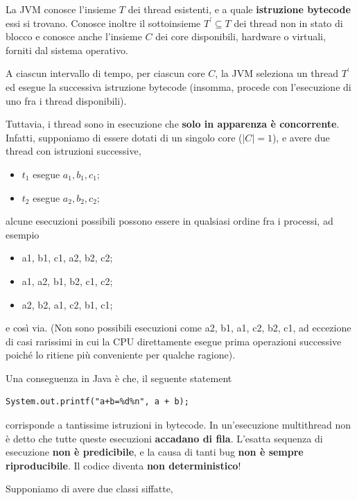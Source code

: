\documentclass[\fontsizeclass,twocolumn]{\classname}
\theoremstyle{definition}
\theoremstyle{definition}
\begin{document}
La JVM conosce l'insieme $T$ dei thread esistenti, e a quale \textbf{istruzione
bytecode} essi si trovano. Conosce inoltre il sottoinsieme $T^\prime \subseteq
T$ dei thread non in stato di blocco e conosce anche l'insieme $C$ dei core
disponibili, hardware o virtuali, forniti dal sistema operativo.

A ciascun intervallo di tempo, per ciascun core $C$, la JVM seleziona un thread
$T^\prime$ ed esegue la successiva istruzione bytecode (insomma, procede con
l'esecuzione di uno fra i thread disponibili).

Tuttavia, i thread sono in esecuzione che \textbf{solo in apparenza è
concorrente}. Infatti, supponiamo di essere dotati di un singolo core ($|C| =
1$), e avere due thread con istruzioni successive,
\begin{itemize}
    \item $t_1$ esegue $a_1, b_1, c_1$;
    \item $t_2$ esegue $a_2, b_2, c_2$;
\end{itemize}

alcune esecuzioni possibili possono essere in qualsiasi ordine fra i processi,
ad esempio

\begin{itemize}
    \item a1, b1, c1, a2, b2, c2;
    \item a1, a2, b1, b2, c1, c2;
    \item a2, b2, a1, c2, b1, c1;
\end{itemize}

e così via. (Non sono possibili esecuzioni come a2, b1, a1, c2, b2, c1, ad
eccezione di casi rarissimi in cui la CPU direttamente esegue prima operazioni
successive poiché lo ritiene più conveniente per qualche ragione).

Una conseguenza in Java è che, il seguente statement

\begin{lstlisting}
System.out.printf("a+b=%d%n", a + b);
\end{lstlisting}

corrisponde a tantissime istruzioni in bytecode. In un'esecuzione multithread
non è detto che tutte queste esecuzioni \textbf{accadano di fila}. L'esatta
sequenza di esecuzione \textbf{non è predicibile}, e la causa di tanti bug
\textbf{non è sempre riproducibile}. Il codice diventa \textbf{non
deterministico}!

Supponiamo di avere due classi siffatte,
\end{document}
